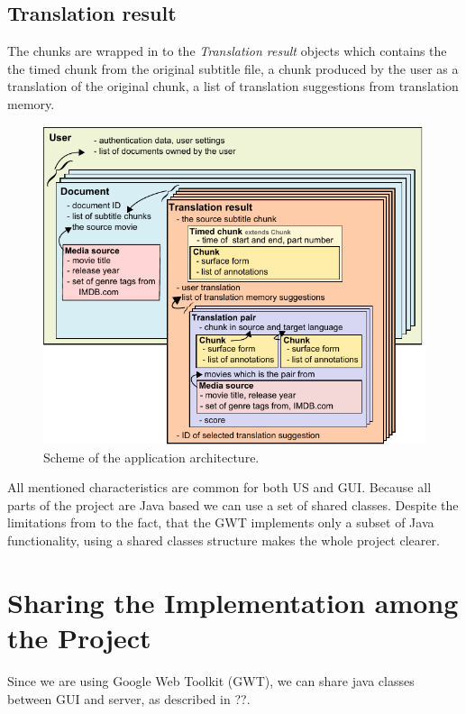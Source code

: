 \subsection*{Translation result}
The chunks are wrapped in to the \emph{Translation result} objects which contains the the timed chunk from the original subtitle file, a chunk produced by the user as a translation of the original chunk, a list of translation suggestions from translation memory.


\begin{figure}[h]
\begin{center}
\includegraphics{figures/shared_classes.pdf}
\end{center}
\caption{Scheme of the application architecture.}\label{projectStructure:logical}
\end{figure}

All mentioned characteristics are common for both US and GUI. Because all parts of the project are Java based we can use a set of shared classes. Despite the limitations from to the fact, that the GWT implements only a subset of Java functionality, using a shared classes structure makes the whole project clearer. 


\section{Sharing the Implementation among the Project}

Since we are using Google Web Toolkit (GWT), we can share java classes between GUI and server, as described in ??.

